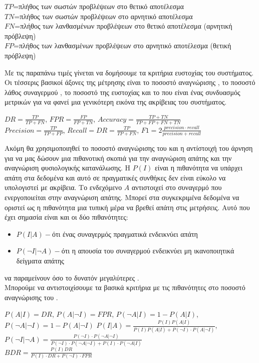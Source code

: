 \begin{center}
$TP$=πλήθος των σωστών προβλέψεων στο θετικό αποτέλεσμα\\
$TN$=πλήθος των σωστών προβλέψεων στο αρνητικό αποτέλεσμα\\
$FN$=πλήθος των λανθασμένων προβλέψεων στο θετικό αποτέλεσμα (αρνητική πρόβλεψη)\\
$FP$=πλήθος των λανθασμένων προβλέψεων στο αρνητικό αποτέλεσμα (θετική πρόβλεψη)\\
\end{center}
Με τις παραπάνω τιμές γίνεται να δομήσουμε τα κριτήρια ευστοχίας του συστήματος. Οι τέσσερις βασικοί άξονες της μέτρησης είναι το ποσοστό αναγνώρισης , το ποσοστό λάθος συναγερμού , το ποσοστό της ευστοχίας  και το  που είναι ένας συνδυασμός μετρικών για να φανεί μια γενικότερη εικόνα της ακρίβειας του συστήματος.
\begin{center}
$DR=\frac{TP}{TP+FN}$, $FPR=\frac{FP}{FP+TN}$, $Accuracy=\frac{TP+TN}{TP+FP+FN+TN}$\\
$Precision=\frac{TP}{TP + FP}$,
$Recall=DR=\frac{TP}{TP + FN}$,
$F1=2\frac{precision \cdotp recall}{precision + recall}$
\end{center}
Ακόμη θα χρησιμοποιηθεί το ποσοστό αναγνώρισης του  και η αντίστοιχή του άρνηση για να μας δώσουν μια πιθανοτική σκοπιά για την αναγνώριση απάτης και την αναγνώριση φυσιολογικής κατανάλωσης. Η $P(I)$ είναι η πιθανότητα να υπάρχει απάτη στα δεδομένα και αυτό σε πραγματικές συνθήκες δεν είναι εύκολο να υπολογιστεί με ακρίβεια. Το ενδεχόμενο $A$ αντιστοιχεί στο συναγερμό που ενεργοποιείται στην αναγνώριση απάτης. Μπορεί στα συγκεκριμένα δεδομένα να οριστεί ως η πιθανότητα μια τυπική μέρα να βρεθεί απάτη στις μετρήσεις. 
Αυτό που έχει σημασία είναι και οι δύο πιθανότητες:
\begin{itemize}
\item $P(I|A)-$ότι ένας συναγερμός πραγματικά ενδεικνύει απάτη
\item $P(\neg{I}|\neg{A})-$ότι η απουσία του συναγερμού ενδεικνύει μη ικανοποιητικά δείγματα απάτης
\end{itemize}
να παραμείνουν όσο το δυνατόν μεγαλύτερες \cite{propab}.\\
Μπορούμε να αντιστοιχίσουμε τα βασικά κριτήρια με τις πιθανότητες στο ποσοστό αναγνώρισης του .
\begin{center}
$P(A|I)=DR$, $P(A|\neg{I})=FPR$, $P(\neg{A}|I)=1-P(A|I)$, $P(\neg{A}|\neg{I})=1-P(A|\neg{I})$
$P(I|A)=\frac{P(I)P(A|I)}{P(I)P(A|I)+P(\neg{I}) \cdotp P(A|\neg{I})}$, 
$P(\neg{I}|\neg{A})=\frac{P(\neg{I}) \cdotp P(\neg{A}|\neg{I})}{P(\neg{I}) \cdotp P(\neg{A}|\neg{I})+P(I) \cdotp P(\neg{A}|I)}$\\
$BDR=\frac{P(I)DR}{P(I) \cdotp DR+P(\neg{I}) \cdotp FPR}$\\

\end{center}
